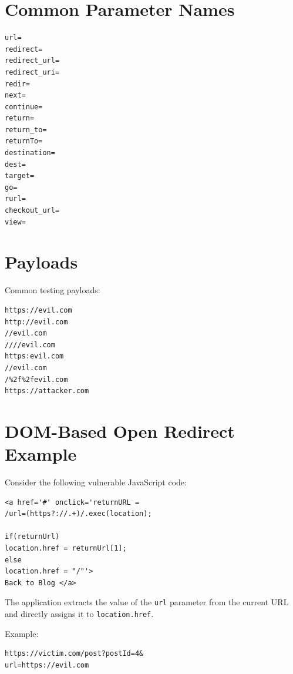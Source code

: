 \documentclass{article}
\begin{document}

\section{Common Parameter Names}

\begin{lstlisting}
url=
redirect=
redirect_url=
redirect_uri=
redir=
next=
continue=
return=
return_to=
returnTo=
destination=
dest=
target=
go=
rurl=
checkout_url=
view=
\end{lstlisting}


\section{Payloads}

Common testing payloads:

\begin{lstlisting}
https://evil.com
http://evil.com
//evil.com
////evil.com
https:evil.com
//evil.com
/%2f%2fevil.com
https://attacker.com
\end{lstlisting}


\section{DOM-Based Open Redirect Example}

Consider the following vulnerable JavaScript code:

\begin{lstlisting}
<a href='#' onclick='returnURL =
/url=(https?://.+)/.exec(location);

if(returnUrl)
location.href = returnUrl[1];
else
location.href = "/"'>
Back to Blog </a>
\end{lstlisting}

The application extracts the value of the \texttt{url} parameter from the current URL and directly assigns it to \texttt{location.href}.

Example:

\begin{lstlisting}
https://victim.com/post?postId=4&
url=https://evil.com
\end{lstlisting}
\end{document}
